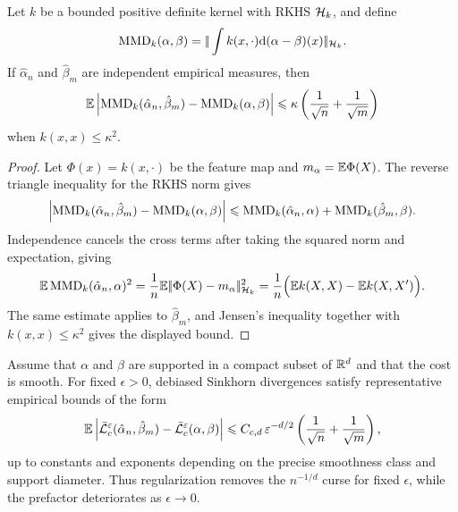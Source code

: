 \begin{prop}\label{prop-mmd-sample-rate}
	Let $k$ be a bounded positive definite kernel with RKHS $\mathcal{H}_k$, and define
	\[
		\operatorname{MMD}_k(\alpha,\beta)
		=
		|\!| \int k(x,\cdot)\mathrm{d}(\alpha-\beta)(x) |\!|_{\mathcal{H}_k}.
	\]
	If $\hat\alpha_n$ and $\hat\beta_m$ are independent empirical measures, then
	\[
		\EE\abs{\MMD_k(\hat\alpha_n,\hat\beta_m)-\MMD_k(\alpha,\beta)}
\index{maximum mean discrepancy}%
		\leq
		\kappa\left(\frac1{\sqrt n}+\frac1{\sqrt m}\right)
	\]
	when $k(x,x)\leq\kappa^2$.
\end{prop}

\begin{proof}
	Let $\Phi(x)=k(x,\cdot)$ be the feature map and $m_\alpha=\mathbb{E}\Phi(X)$. The reverse triangle inequality for the RKHS norm gives
	\[
		\abs{\MMD_k(\hat\alpha_n,\hat\beta_m)-\MMD_k(\alpha,\beta)}
\index{maximum mean discrepancy}%
		\leq
		\MMD_k(\hat\alpha_n,\alpha)+\MMD_k(\hat\beta_m,\beta).
	\]
	Independence cancels the cross terms after taking the squared norm and expectation, giving
	\[
		\mathbb{E}\operatorname{MMD}_k(\hat\alpha_n,\alpha)^2
		=\frac1n\mathbb{E}|\!| \Phi(X)-m_\alpha |\!|_{\mathcal{H}_k}^2
		=\frac{1}{n}\Big(\mathbb{E} k(X,X)-\mathbb{E} k(X,X')\Big).
	\]
	The same estimate applies to $\hat\beta_m$, and Jensen's inequality together with $k(x,x)\leq\kappa^2$ gives the displayed bound.
\end{proof}

\begin{prop}\label{prop-sinkhorn-sample-rate}
	Assume that $\alpha$ and $\beta$ are supported in a compact subset of $\mathbb{R}^d$ and that the cost is smooth. For fixed $\epsilon>0$, debiased Sinkhorn divergences satisfy representative empirical bounds of the form
	\[
		\mathbb{E}\left\lvert\bar{\mathcal{L}}_c^\varepsilon(\hat\alpha_n,\hat\beta_m)-\bar{\mathcal{L}}_c^\varepsilon(\alpha,\beta)\right\rvert
		\leqslant
		C_{c,d}\,\varepsilon^{-d/2}\left(\frac1{\sqrt n}+\frac1{\sqrt m}\right),
	\]
	up to constants and exponents depending on the precise smoothness class and support diameter. Thus regularization removes the $n^{-1/d}$ curse for fixed $\epsilon$, while the prefactor deteriorates as $\epsilon\to0$.
\end{prop}

